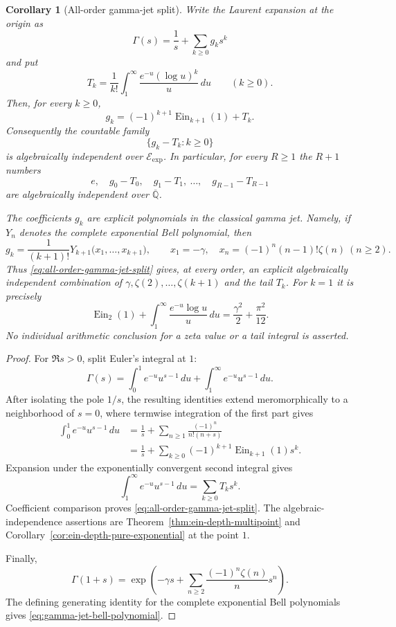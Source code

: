 \documentclass[11pt]{article}
\newtheorem{corollary}[theorem]{Corollary}
\theoremstyle{definition}
\theoremstyle{remark}
\newcommand{\EinDepth}[1]{\operatorname{Ein}_{#1}}
\newcommand{\Eexp}{\mathcal E_{\mathrm{exp}}}
\begin{document}
\begin{corollary}[All-order gamma-jet split]
\label{cor:all-order-gamma-jet-split}
Write the Laurent expansion at the origin as
\[
 \Gamma(s)=\frac1s+\sum_{k\geq0}g_ks^k
\]
and put
\[
 T_k=\frac1{k!}\int_1^\infty
       \frac{e^{-u}(\log u)^k}{u}\,du\qquad(k\geq0).
\]
Then, for every $k\geq0$,
\begin{equation}\label{eq:all-order-gamma-jet-split}
 g_k=(-1)^{k+1}\EinDepth{k+1}(1)+T_k.
\end{equation}
Consequently the countable family
\[
 \{g_k-T_k:k\geq0\}
\]
is algebraically independent over $\Eexp$.  In particular, for every
$R\geq1$ the $R+1$ numbers
\[
 e,\quad g_0-T_0,\quad g_1-T_1,\ \ldots,\quad g_{R-1}-T_{R-1}
\]
are algebraically independent over $\overline{\mathbb Q}$.

The coefficients $g_k$ are explicit polynomials in the classical gamma
jet.  Namely, if $Y_n$ denotes the complete exponential Bell polynomial,
then
\begin{equation}\label{eq:gamma-jet-bell-polynomial}
 g_k=\frac1{(k+1)!}
 Y_{k+1}\bigl(x_1,\ldots,x_{k+1}\bigr),
 \qquad
 x_1=-\gamma,\quad
 x_n=(-1)^n(n-1)!\zeta(n)\ (n\geq2).
\end{equation}
Thus \eqref{eq:all-order-gamma-jet-split} gives, at every order, an
explicit algebraically independent combination of
$\gamma,\zeta(2),\ldots,\zeta(k+1)$ and the tail $T_k$.
For $k=1$ it is precisely
\[
 \EinDepth{2}(1)+\int_1^\infty\frac{e^{-u}\log u}{u}\,du
 =\frac{\gamma^2}{2}+\frac{\pi^2}{12}.
\]
No individual arithmetic conclusion for a zeta value or a tail integral
is asserted.
\end{corollary}

\begin{proof}
For $\Re s>0$, split Euler's integral at $1$:
\[
 \Gamma(s)=\int_0^1e^{-u}u^{s-1}\,du
           +\int_1^\infty e^{-u}u^{s-1}\,du.
\]
After isolating the pole $1/s$, the resulting identities extend
meromorphically to a neighborhood of $s=0$, where termwise integration of
the first part gives
\begin{align*}
 \int_0^1e^{-u}u^{s-1}\,du
 &=\frac1s+\sum_{n\geq1}\frac{(-1)^n}{n!(n+s)}\\
 &=\frac1s+\sum_{k\geq0}(-1)^{k+1}
   \EinDepth{k+1}(1)s^k.
\end{align*}
Expansion under the exponentially convergent second integral gives
\[
 \int_1^\infty e^{-u}u^{s-1}\,du
 =\sum_{k\geq0}T_ks^k.
\]
Coefficient comparison proves \eqref{eq:all-order-gamma-jet-split}.
The algebraic-independence assertions are
Theorem~\ref{thm:ein-depth-multipoint} and
Corollary~\ref{cor:ein-depth-pure-exponential} at the point $1$.

Finally,
\[
 \Gamma(1+s)=
 \exp\!\left(-\gamma s+
   \sum_{n\geq2}\frac{(-1)^n\zeta(n)}n s^n\right).
\]
The defining generating identity for the complete exponential Bell
polynomials gives \eqref{eq:gamma-jet-bell-polynomial}.
\end{proof}
\end{document}

